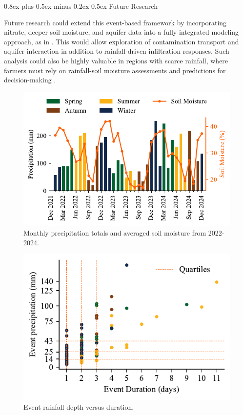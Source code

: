 \documentclass[9pt, twocolumn]{extarticle}
\makeatletter
\renewcommand\section{\@startsection{section}{1}{0pt}%
  {0.8ex plus 0.5ex minus 0.2ex}%
  {0.5ex}%
  {\normalfont\Large\bfseries}}
\makeatother
\begin{document}
\section{Future Research}

Future research could extend this event-based framework by incorporating nitrate, deeper soil moisture, and aquifer data into a fully integrated modeling approach, as in \textcite{Fahs2025}. This would allow exploration of contamination transport and aquifer interaction in addition to rainfall-driven infiltration responses. Such analysis could also be highly valuable in regions with scarce rainfall, where farmers must rely on rainfall-soil moisture assessments and predictions for decision-making \cite{haghighi}.

\begin{figure}[!h] %
  \centering
  \includegraphics[width=1\columnwidth]{monthly_precip_sm}
  \caption{Monthly precipitation totals and averaged soil moisture from 2022-2024.}
  \label{fig:monthly_precip_sm}
\end{figure}

\begin{figure}[!h] %
  \centering
  \includegraphics[width=0.7\columnwidth]{rain events}
  \caption{Event rainfall depth versus duration.}
  \label{fig:rain_events}
\end{figure}
\end{document}
